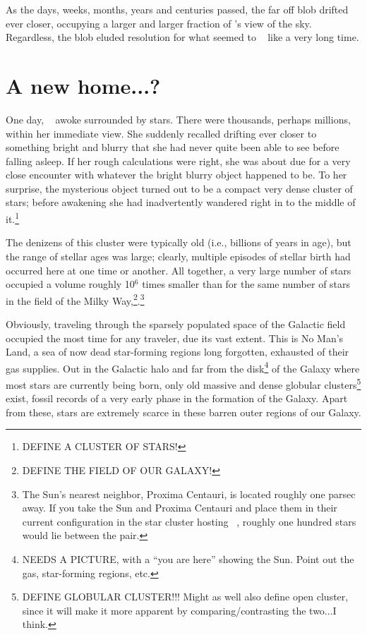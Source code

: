 \documentclass[main.tex]{subfiles}
\begin{document}
\newpara \nar As the days, weeks, months, years and centuries passed, the far off blob drifted ever closer, occupying a larger and larger fraction of \rmsterope's view of the sky.  Regardless, the blob eluded resolution for what seemed to \rmsterope~ like a very long time.

\section{A new home...?}

\newpara \nar One day, \rmsterope~  awoke surrounded by stars.  There were thousands, perhaps millions, within her immediate view.  She suddenly recalled drifting ever closer to something bright and blurry that she had never quite been able to see before falling asleep.  If her rough calculations were right, she was about due for a very close encounter with whatever the bright blurry object happened to be.  To her surprise, the mysterious object turned out to be a compact very dense cluster of stars; before awakening she had inadvertently wandered right in to the middle of it.\footnote{DEFINE A CLUSTER OF STARS!}

\newpara \nar The denizens of this cluster were typically old (i.e., billions of years in age), but the range of stellar ages was large; clearly, multiple episodes of stellar birth had occurred here at one time or another.  All together, a very large number of stars occupied a volume roughly 10$^6$ times smaller than for the same number of stars in the field of the Milky Way,\footnote{DEFINE THE FIELD OF OUR GALAXY!}.\footnote{The Sun's nearest neighbor, Proxima Centauri, is located roughly one parsec away.  If you take the Sun and Proxima Centauri and place them in their current configuration in the star cluster hosting \rmsterope~, roughly one hundred stars would lie between the pair.} 

\newpara \nar Obviously, traveling through the sparsely populated space of the Galactic field occupied the most time for any traveler, due its vast extent.  This is No Man's Land, a sea of now dead star-forming regions long forgotten, exhausted of their gas supplies.  Out in the Galactic halo and far from the disk\footnote{NEEDS A PICTURE, with a ``you are here'' showing the Sun. Point out the gas, star-forming regions, etc.} of the Galaxy where most stars are currently being born, only old massive and dense globular clusters\footnote{DEFINE GLOBULAR CLUSTER!!! Might as well also define open cluster, since it will make it more apparent by comparing/contrasting the two...I think.} exist, fossil records of a very early phase in the formation of the Galaxy.  Apart from these, stars are extremely scarce in these barren outer regions of our Galaxy. 
\end{document}
